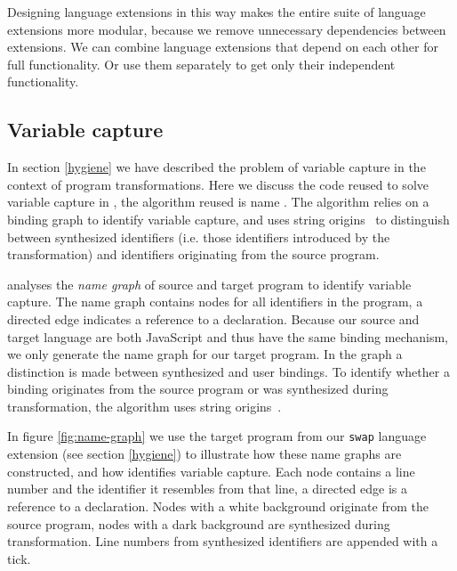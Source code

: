 Designing language extensions in this way makes the entire suite of language extensions more modular, because we remove unnecessary dependencies between extensions. We can combine language extensions that depend on each other for full functionality. Or use them separately to get only their independent functionality.

\subsection{Variable capture}
In section \ref{hygiene} we have described the problem of variable capture in the context of program transformations. 
Here we discuss the code reused to solve variable capture in \projectname, the algorithm reused is name \textit{\vfix}. The algorithm relies on a binding graph to identify variable capture, and uses string origins~\cite{Inostroza2014} to distinguish between synthesized identifiers (i.e. those identifiers introduced by the transformation) and identifiers originating from the source program.

\textit{\vfix} analyses the \textit{name graph} of source and target program to identify variable capture. The name graph contains nodes for all identifiers in the program, a directed edge indicates a reference to a declaration. Because our source and target language are both JavaScript and thus have the same binding mechanism, we only generate the name graph for our target program. In the graph a distinction is made between synthesized and user bindings. To identify whether a binding originates from the source program or was synthesized during transformation, the \textit{\vfix} algorithm uses string origins~\cite{Inostroza2014}.

In figure \ref{fig:name-graph} we use the target program from our \lstinline$swap$ language extension (see section \ref{hygiene}) to illustrate how these name graphs are constructed, and how \textit{\vfix} identifies variable capture. Each node contains a line number and the identifier it resembles from that line, a directed edge is a reference to a declaration. Nodes with a white background originate from the source program, nodes with a dark background are synthesized during transformation. Line numbers from synthesized identifiers are appended with a tick.

